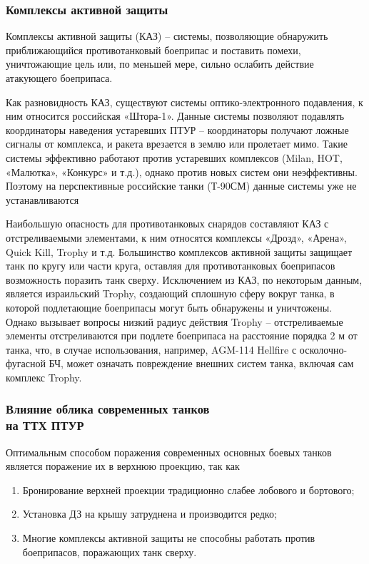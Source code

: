 \subsubsection{Комплексы активной защиты}
Комплексы активной защиты (КАЗ) – системы, позволяющие обнаружить приближающийся противотанковый боеприпас и поставить помехи, уничтожающие цель или, по меньшей мере, сильно ослабить действие атакующего боеприпаса.

Как разновидность КАЗ, существуют системы оптико-электронного подавления, к ним относится российская «Штора-1». Данные системы позволяют подавлять координаторы наведения устаревших ПТУР – координаторы получают ложные сигналы от комплекса, и ракета врезается в землю или пролетает мимо. Такие системы эффективно работают против устаревших комплексов (Milan, HOT, «Малютка», «Конкурс» и т.д.), однако против новых систем они неэффективны. Поэтому на перспективные российские танки (Т-90СМ) данные системы уже не устанавливаются

Наибольшую опасность для противотанковых снарядов составляют КАЗ с отстреливаемыми элементами, к ним относятся комплексы «Дрозд», «Арена», Quick Kill, Trophy и т.д.
Большинство комплексов активной защиты защищает танк по кругу или части круга, оставляя для противотанковых боеприпасов возможность поразить танк сверху. Исключением из КАЗ, по некоторым данным, является израильский Trophy, создающий сплошную сферу вокруг танка, в которой подлетающие боеприпасы могут быть обнаружены и уничтожены. Однако вызывает вопросы низкий радиус действия Trophy – отстреливаемые элементы отстреливаются при подлете боеприпаса на расстояние порядка 2 м от танка, что, в случае использования, например, AGM-114 Hellfire с осколочно-фугасной БЧ, может означать повреждение внешних систем танка, включая сам комплекс Trophy.

\clearpage
\subsubsection{Влияние облика современных танков\\на ТТХ ПТУР}
Оптимальным способом поражения современных основных боевых танков является поражение их в верхнюю проекцию, так как
\begin{enumerate}[1.]
	\item Бронирование верхней проекции традиционно слабее лобового и бортового;
	\item Установка ДЗ на крышу затруднена и производится редко;
	\item Многие комплексы активной защиты не способны работать против боеприпасов, поражающих танк сверху.
\end{enumerate}


